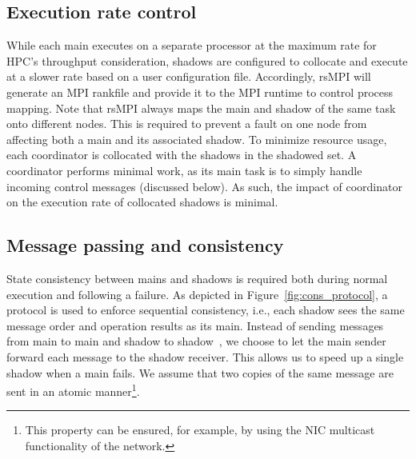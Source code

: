 \subsection{Execution rate control}
\label{sec:rate_control}
While each main executes on a separate processor at the maximum rate for HPC's throughput consideration, shadows are configured to collocate and execute at a slower rate based on a user configuration file. Accordingly, rsMPI will generate an MPI rankfile and provide it to the MPI runtime to control process mapping. Note that rsMPI always maps the main and shadow of the same task onto different nodes. This is required to prevent a fault on one node from affecting  both a main and its associated  shadow.
To minimize resource usage, each coordinator is collocated with the shadows in the shadowed set. 
A coordinator performs  minimal work, as its main task is to simply handle incoming control messages (discussed below).  As such, the impact of coordinator on the execution rate of collocated shadows is minimal.



\subsection{Message passing and consistency}
State consistency between mains and shadows is required both during normal execution and following a failure. %
As depicted in Figure~\ref{fig:cons_protocol}, a protocol is used 
to enforce sequential consistency, i.e., each shadow sees the same message order and operation results as its main. 
Instead of sending messages from main to main and shadow to shadow~\cite{ferreira_sc_2011}, we choose to let the main sender forward each message to the shadow receiver. This allows us to speed up a single shadow when a main fails. 
We assume that two copies of the same message are sent in an atomic manner\footnote{This property can be ensured, for example, by using the NIC multicast functionality of the network.}.

